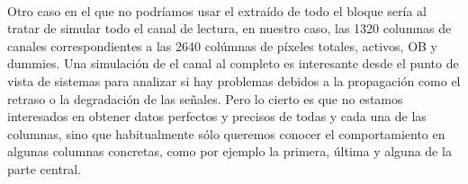 \paragraph{}
Otro caso en el que no podríamos usar el extraído de todo el bloque sería al tratar
de simular todo el canal de lectura, en nuestro caso, las 1320 columnas de canales
correspondientes a las 2640 colúmnas de píxeles totales, activos, OB y dummies.
Una simulación de el canal al completo es interesante desde el punto de vista de
sistemas para analizar si hay problemas debidos a la propagación como el retraso
o la degradación de las señales. Pero lo cierto es que no estamos interesados
en obtener datos perfectos y precisos de todas y cada una de las columnas, sino que
habitualmente sólo queremos conocer el comportamiento en algunas columnas concretas,
como por ejemplo la primera, última y alguna de la parte central.

